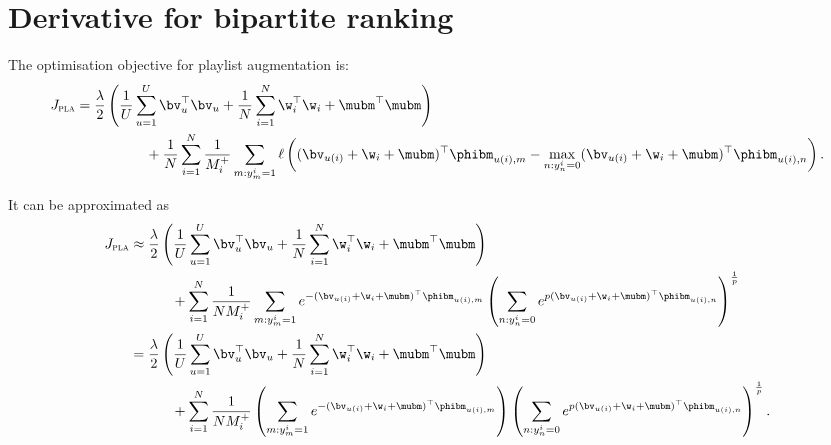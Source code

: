 \section{Derivative for bipartite ranking}

The optimisation objective for playlist augmentation is:
\begin{equation}
\label{eq:primal_pla}
\begin{aligned}
J_\textsc{pla} 
&= \frac{\lambda}{2} \left( \frac{1}{U} \sum_{u=1}^U \bv_u^\top \bv_u 
     + \frac{1}{N} \sum_{i=1}^N \w_i^\top \w_i + \mubm^\top \mubm \right) \\
& \hspace{5em}
     + \frac{1}{N} \sum_{i=1}^N \frac{1}{M_i^+} \sum_{m: y_m^i = 1} \ell \left( (\bv_{u(i)} + \w_i + \mubm)^\top \phibm_{u(i),m}
     - \max_{n: y_n^i = 0} (\bv_{u(i)} + \w_i + \mubm)^\top \phibm_{u(i),n} \right).
\end{aligned}
\end{equation}

It can be approximated as
\begin{equation*}
\begin{aligned}
J_\textsc{pla} 
&\approx \frac{\lambda}{2} \left( \frac{1}{U} \sum_{u=1}^U \bv_u^\top \bv_u + \frac{1}{N} \sum_{i=1}^N \w_i^\top \w_i + \mubm^\top \mubm \right) \\
& \hspace{3em}
  + \sum_{i=1}^N \frac{1}{N M_i^+} \sum_{m: y_m^i = 1} 
    e^{-(\bv_{u(i)} + \w_i + \mubm)^\top \phibm_{u(i),m}}
    \left( \sum_{n: y_n^i = 0} e^{p (\bv_{u(i)} + \w_i + \mubm)^\top \phibm_{u(i),n}} \right)^\frac{1}{p} \\
&= \frac{\lambda}{2} \left( \frac{1}{U} \sum_{u=1}^U \bv_u^\top \bv_u + \frac{1}{N} \sum_{i=1}^N \w_i^\top \w_i + \mubm^\top \mubm \right) \\
& \hspace{3em}
  + \sum_{i=1}^N \frac{1}{N M_i^+} 
    \left( \sum_{m: y_m^i = 1} e^{-(\bv_{u(i)} + \w_i + \mubm)^\top \phibm_{u(i),m}} \right)
    \left( \sum_{n: y_n^i = 0} e^{p (\bv_{u(i)} + \w_i + \mubm)^\top \phibm_{u(i),n}} \right)^\frac{1}{p}.
\end{aligned}
\end{equation*}

